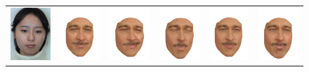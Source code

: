 \setlength{\tabcolsep}{3pt}
\begin{figure}
\begin{tabular}{cccccc}

\includegraphics[width=.1535\textwidth]{figures/results/pitt_on_yi/000001.jpg}&
\includegraphics[width=.1535\textwidth]{figures/results/pitt_on_yi/light000002_big.png}&
\includegraphics[width=.1535\textwidth]{figures/results/pitt_on_yi/light000003_big.png}&
\includegraphics[width=.1535\textwidth]{figures/results/pitt_on_yi/light000004_big.png}&
\includegraphics[width=.1535\textwidth]{figures/results/pitt_on_yi/light000001_big.png}&
\includegraphics[width=.1535\textwidth]{figures/results/pitt_on_yi/v2/light000006_big.png}\\

\end{tabular}
\end{figure}
